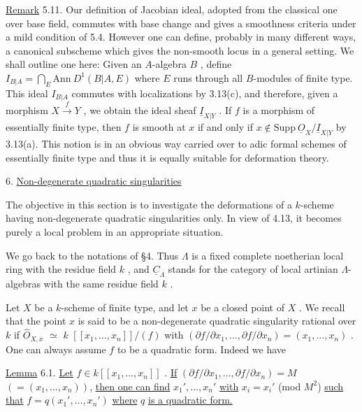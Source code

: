 \underline{Remark} 5.11.  Our definition of Jacobian ideal, adopted from the classical one over base field, commutes with base change and gives a smoothness criteria under a mild condition of 5.4. However one can define, probably in many different ways, a canonical subscheme which gives the non-smooth locus in a general setting. We shall outline one here:  Given an $A$-algebra  $B$  , define  $I_{B|A} = \bigcap_E \mathrm{Ann}\ D^1(B|A,E)$ where  $E$  runs through all  $B$-modules of finite type. This ideal  $I_{B|A}$  commutes with localizations by 3.13(c), and therefore, given a morphism  $X \xrightarrow{\ f\ } Y$  , we obtain the ideal sheaf  $\underline{I}_{X|Y}$  . If  $f$  is a morphism of essentially finite type, then  $f$  is smooth at  $x$  if and only if  $x \notin \mathrm{Supp}\ \underline{O}_X/\underline{I}_{X|Y}$  by 3.13(a). This notion is in an obvious way carried over to adic formal schemes of essentially
finite type and thus it is equally suitable for deformation theory.


6.  \underline{Non-degenerate quadratic singularities}

The objective in this section is to investigate the deformations of a $k$-scheme having non-degenerate quadratic singularities only. In view of 4.13, it becomes purely a local problem in an appropriate situation.

We go back to the notations of  §4. Thus  $\Lambda$  is a fixed complete noetherian local ring with the residue field  $k$  , and  $\underline{C}_\Lambda$  stands for the category of local artinian $\Lambda$-algebras with the same residue field  $k$  .

Let  $X$  be a $k$-scheme of finite type, and let  $x$  be a closed point of $X$  . We recall that the point  $x$  is said to be a non-degenerate quadratic singularity rational over  $k$  if  $\hat{O}_{X,x}$ $\simeq$ $k$ $[[x_1,\ldots,x_n]]/(f)$  with $(\partial f/\partial x_1,\ldots,\partial f/\partial x_n) = (x_1,\ldots,x_n)$  . One  can always assume  $f$  to be a quadratic form. Indeed we have

\underline{Lemma} 6.1.  \underline{Let}  $f \in k[[x_1,\ldots,x_n]]$  . \underline{If}  $(\partial f/\partial x_1,\ldots,\partial f/\partial x_n) = M$  $(= (x_1,\ldots,x_n))$, \underline{then one can find}  $x_1',\ldots,x_n'$  \underline{with}  $x_i = x_i'$  (mod $M^2$)  \underline{such that} $f = q(x_1',\ldots,x_n')$  \underline{where}  $q$  \underline{is a quadratic form.}

